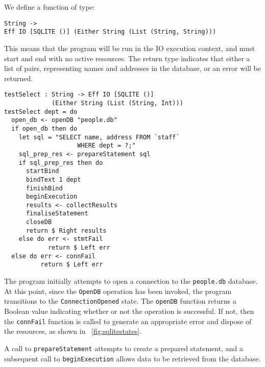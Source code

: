 \documentclass[preprint]{sigplanconf}
\begin{document}
We define a function of type:
\begin{Verbatim}
String ->
Eff IO [SQLITE ()] (Either String (List (String, String)))
\end{Verbatim}
This means that the program will be run in the IO execution context, and must start and end with no active resources. The return type indicates that either a list of  pairs, representing names and addresses in the database, or an error will be returned. 
\begin{Verbatim}
testSelect : String -> Eff IO [SQLITE ()] 
             (Either String (List (String, Int)))
testSelect dept = do
  open_db <- openDB "people.db"
  if open_db then do
    let sql = "SELECT name, address FROM `staff` 
                    WHERE dept = ?;"
    sql_prep_res <- prepareStatement sql
    if sql_prep_res then do 
      startBind
      bindText 1 dept
      finishBind
      beginExecution
      results <- collectResults
      finaliseStatement
      closeDB
      return $ Right results
    else do err <- stmtFail
            return $ Left err
  else do err <- connFail
          return $ Left err 
\end{Verbatim}
The program initially attempts to open a connection to the \texttt{people.db} database. At this point, since the \texttt{OpenDB} operation has been invoked, the program transitions to the \texttt{ConnectionOpened} state. The \texttt{openDB} function returns a Boolean value indicating whether or not the operation is successful. If not, then the \texttt{connFail} function is called to generate an appropriate error and dispose of the resources, as shown in ~\ref{fig:sqlitestates}.

A call to \texttt{prepareStatement} attempts to create a prepared statement, and a subsequent call to \texttt{beginExecution} allows data to be retrieved from the database.
\end{document}
